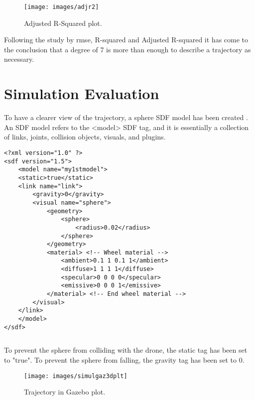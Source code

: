 \begin{figure}[H]
	\centering
	\texttt{[image: images/adjr2]}
	\caption[Adjusted R-Squared.]{Adjusted R-Squared plot.}
	\label{fig:adjr2}
\end{figure}

\noindent Following the study by \gls{rmse}, R-squared and Adjusted R-squared it has come to the conclusion that a degree of 7 is more than enough to describe a trajectory as necessary.


\section{Simulation Evaluation}
\label{sec:drinact}

To have a clearer view of the trajectory, a sphere SDF model has been created . An SDF model refers to the <model> SDF tag, and it is essentially a collection of links, joints, collision objects, visuals, and plugins.

\medskip
\begin{lstlisting}
<?xml version="1.0" ?>
<sdf version="1.5">
    <model name="my1stmodel">
    <static>true</static> 
    <link name="link">
        <gravity>0</gravity>
        <visual name="sphere">
            <geometry>
                <sphere>
                    <radius>0.02</radius>
                </sphere>
            </geometry>
            <material> <!-- Wheel material -->
                <ambient>0.1 1 0.1 1</ambient>
                <diffuse>1 1 1 1</diffuse>
                <specular>0 0 0 0</specular>
                <emissive>0 0 0 1</emissive>
            </material> <!-- End wheel material -->
        </visual>
    </link>
    </model>
</sdf>
\end{lstlisting}

\begin{lstlisting}[frame=none,caption={Sphere SDF model.}, 
label=lst:sdfmod]
\end{lstlisting}

\noindent To prevent the sphere from colliding with the drone, the static tag has been set to "true". To prevent the sphere from falling, the gravity tag has been set to $0$. 

\begin{figure}[H]
	\centering
	\texttt{[image: images/simulgaz3dplt]}
	\caption[Trajectory in Gazebo plot.]{Trajectory in Gazebo plot.}
	\label{fig:trjgazpl}
\end{figure}

